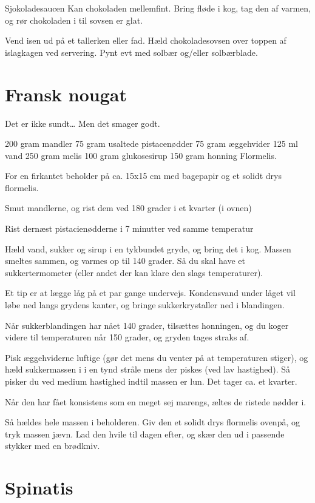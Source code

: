 \documentclass[
]{book}
\begin{document}
Sjokoladesaucen
Kan chokoladen mellemfint. Bring fløde i kog, tag den af varmen, og rør
chokoladen i til sovsen er glat.

Vend isen ud på et tallerken eller fad. Hæld chokoladesovsen over toppen af
islagkagen ved servering. Pynt evt med solbær og/eller solbærblade.

\hypertarget{fransk-nougat}{%
\section{Fransk nougat}\label{fransk-nougat}}

Det er ikke sundt\ldots{} Men det smager godt.

200 gram mandler
75 gram usaltede pistacenødder
75 gram æggehvider
125 ml vand
250 gram melis
100 gram glukosesirup
150 gram honning
Flormelis.

For en firkantet beholder på ca. 15x15 cm med bagepapir og et solidt drys flormelis.

Smut mandlerne, og rist dem ved 180 grader i et kvarter (i ovnen)

Rist dernæst pistacienødderne i 7 minutter ved samme temperatur

Hæld vand, sukker og sirup i en tykbundet gryde, og bring det i kog. Massen smeltes sammen, og varmes op til 140 grader. Så du skal have et sukkertermometer (eller andet der kan klare den slags temperaturer).

Et tip er at lægge låg på et par gange undervejs. Kondensvand under låget vil løbe ned langs grydens kanter, og bringe sukkerkrystaller ned i blandingen.

Når sukkerblandingen har nået 140 grader, tilsættes honningen, og du koger videre til temperaturen når 150 grader, og gryden tages straks af.

Pisk æggehviderne luftige (gør det mens du venter på at temperaturen stiger), og hæld sukkermassen i i en tynd stråle mens der piskes (ved lav hastighed). Så pisker du ved medium hastighed indtil massen er lun. Det tager ca. et kvarter.

Når den har fået konsistens som en meget sej marengs, æltes de ristede nødder i.

Så hældes hele massen i beholderen. Giv den et solidt drys flormelis ovenpå, og tryk massen jævn. Lad den hvile til dagen efter, og skær den ud i passende stykker med en brødkniv.

\hypertarget{spinatis}{%
\section{Spinatis}\label{spinatis}}
\end{document}
